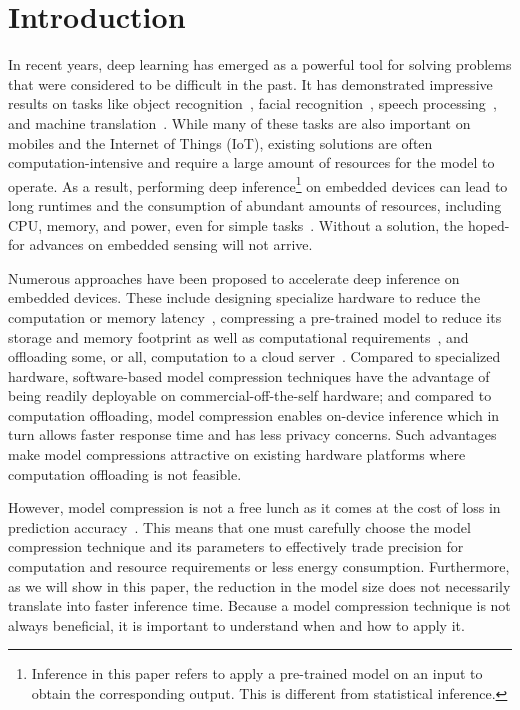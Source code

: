 \section{Introduction}
In recent years, deep learning has emerged as a powerful tool for solving problems that were considered to be difficult in the past. It has
demonstrated impressive results on tasks like object recognition~\cite{donahue14,he2016deep}, facial
recognition~\cite{parkhi2015deep,sun2014deep}, speech processing~\cite{pmlrv48amodei16}, and machine translation~\cite{bahdanau2014neural}.
While many of these tasks are also important on mobiles and the Internet of Things (IoT), existing solutions are often
computation-intensive and require a large amount of resources for the model to operate. As a result, performing deep
inference\footnote{Inference in this paper refers to apply a pre-trained model on an input to obtain the corresponding output. This is
different from statistical inference.} on embedded devices can lead to long runtimes and the consumption of abundant amounts of resources,
including CPU, memory, and power, even for simple tasks~\cite{CanzianiPC16}. Without a solution,
 the hoped-for advances on embedded sensing will not arrive.


Numerous approaches have been proposed to accelerate deep inference on embedded devices. These include designing specialize hardware to
reduce the computation or memory latency~\cite{georgiev2017low}, compressing a pre-trained model to reduce its storage and memory footprint
as well as computational requirements~\cite{han2016eie}, and offloading some, or all, computation to a cloud
server~\cite{Kang2017neurosurgeon,teerapittayanon2017distributed}. Compared to specialized hardware, software-based model compression
techniques have the advantage of being readily deployable on commercial-off-the-self hardware; and compared to computation offloading,
model compression enables on-device inference which in turn allows faster response time and has less privacy concerns. Such advantages make
model compressions attractive on existing hardware platforms where computation offloading is not feasible.


However, model compression is not a free lunch as it comes at the cost of loss in prediction accuracy~\cite{cheng2017survey}. This means that one must
carefully choose the model compression technique and its parameters to effectively trade precision for computation and resource
requirements or less energy consumption. Furthermore, as we will show in this paper, the reduction in the model size does not necessarily
translate into faster inference time. Because a model compression technique is not always beneficial, it is important to understand when
and how to apply it.

